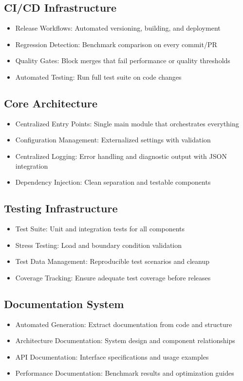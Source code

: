 \documentclass{article}
\begin{document}
\subsection{CI/CD Infrastructure}
\begin{itemize}[noitemsep]
\item Release Workflows: Automated versioning, building, and deployment
\item Regression Detection: Benchmark comparison on every commit/PR
\item Quality Gates: Block merges that fail performance or quality thresholds
\item Automated Testing: Run full test suite on code changes
\end{itemize}

\subsection{Core Architecture}
\begin{itemize}[noitemsep]
\item Centralized Entry Points: Single main module that orchestrates everything
\item Configuration Management: Externalized settings with validation
\item Centralized Logging: Error handling and diagnostic output with JSON integration
\item Dependency Injection: Clean separation and testable components
\end{itemize}

\subsection{Testing Infrastructure}
\begin{itemize}[noitemsep]
\item Test Suite: Unit and integration tests for all components
\item Stress Testing: Load and boundary condition validation
\item Test Data Management: Reproducible test scenarios and cleanup
\item Coverage Tracking: Ensure adequate test coverage before releases
\end{itemize}

\subsection{Documentation System}
\begin{itemize}[noitemsep]
\item Automated Generation: Extract documentation from code and structure
\item Architecture Documentation: System design and component relationships
\item API Documentation: Interface specifications and usage examples
\item Performance Documentation: Benchmark results and optimization guides
\end{itemize}
\end{document}
